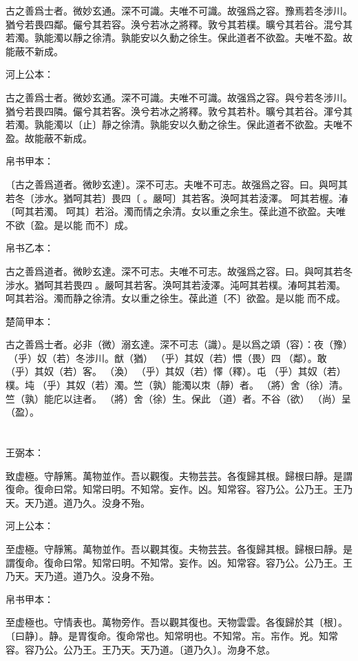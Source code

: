 \documentclass[a5paper]{ctexbook}
\begin{document}
    古之善爲士者。微妙玄通。深不可識。夫唯不可識。故强爲之容。豫焉若冬涉川。猶兮若畏四鄰。儼兮其若容。涣兮若冰之將釋。敦兮其若樸。曠兮其若谷。混兮其若濁。孰能濁以靜之徐清。孰能安以久動之徐生。保此道者不欲盈。夫唯不盈。故能蔽不新成。

    河上公本：

    古之善爲士者。微妙玄通。深不可識。夫唯不可識。故强爲之容。與兮若冬涉川。猶兮若畏四隣。儼兮其若客。涣兮若冰之將釋。敦兮其若朴。曠兮其若谷。渾兮其若濁。孰能濁以〔止〕靜之徐清。孰能安以久動之徐生。保此道者不欲盈。夫唯不盈。故能蔽不新成。

    帛书甲本：

    〔古之善爲道者。微眇玄達〕。深不可志。夫唯不可志。故强爲之容。曰。與呵其若冬〔涉水。猶呵其若〕畏四〔𠳵。嚴呵〕其若客。涣呵其若淩澤。󱁜呵其若楃。湷〔呵其若濁。𣼥呵其〕若浴。濁而情之余清。女以重之余生。葆此道不欲盈。夫唯不欲〔盈。是以能𧝬而不〕成。

    帛书乙本：

    古之善爲道者。微眇玄達。深不可志。夫唯不可志。故强爲之容。曰。與呵其若冬涉水。猶呵其若畏四𠳵。嚴呵其若客。涣呵其若淩澤。沌呵其若樸。湷呵其若濁。𣼥呵其若浴。濁而静之徐清。女以重之徐生。葆此道〔不〕欲盈。是以能𧝬而不成。

    楚简甲本：

    古之善爲士者。必非（微）溺玄達。深不可志（識）。是以爲之頌（容）：夜（豫）󶴋（乎）奴（若）冬涉川。猷（猶）󶴋（乎）其奴（若）愄（畏）四𠳵（鄰）。敢󶴋（乎）其奴（若）客。󶴝（渙）󶴋（乎）其奴（若）懌（釋）。屯󶴋（乎）其奴（若）樸。坉󶴋（乎）其奴（若）濁。竺（孰）能濁以朿（靜）者。𨟻（將）舍（徐）清。竺（孰）能庀以迬者。𨟻（將）舍（徐）生。保此𧗟（道）者。不谷（欲）󶴞（尚）呈（盈）。

    \chapter{}
    王弼本：

    致虚極。守靜篤。萬物並作。吾以觀復。夫物芸芸。各復歸其根。歸根曰靜。是謂復命。復命曰常。知常曰明。不知常。妄作。凶。知常容。容乃公。公乃王。王乃天。天乃道。道乃久。没身不殆。

    河上公本：

    至虚極。守靜篤。萬物並作。吾以觀其復。夫物芸芸。各復歸其根。歸根曰靜。是謂復命。復命曰常。知常曰明。不知常。妄作。凶。知常容。容乃公。公乃王。王乃天。天乃道。道乃久。没身不殆。

    帛书甲本：

    至虚極也。守情表也。萬物旁作。吾以觀其復也。天物雲雲。各復歸於其〔根〕。〔曰静〕。静。是胃復命。復命常也。知常明也。不知常。㠵。㠵作。兇。知常容。容乃公。公乃王。王乃天。天乃道。〔道乃久〕。沕身不怠。
\end{document}
